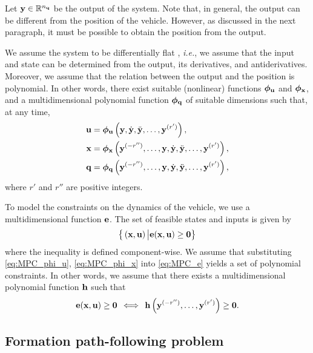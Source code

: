 Let $\mathbf{y} \in \mathbb{R}^{n_{\mathbf{q}}}$ be the output of the system.
Note that, in general, the output can be different from the position of the vehicle.
However, as discussed in the next paragraph, it must be possible to obtain the position from the output.

We assume the system to be differentially flat \cite{fliess_1995_flatness}, \emph{i.e.}, we assume that the input and state can be determined from the output, its derivatives, and antiderivatives. Moreover, we assume that the relation between the output and the position is polynomial.
In other words, there exist suitable (nonlinear) functions $\bm{\phi}_{\mathbf{u}}$ and $\bm{\phi}_{\mathbf{x}}$, and a multidimensional polynomial function $\bm{\phi}_{\mathbf{q}}$ of suitable dimensions such that, at any time,
%
\begin{align}
    \mathbf{u} &= \bm{\phi}_{\mathbf{u}} \left(\mathbf{y}, \dot{\mathbf{y}}, \ddot{\mathbf{y}}, \ldots, \mathbf{y}^{(r')}\right), \label{eq:MPC_phi_u} \\
    \mathbf{x} &= \bm{\phi}_{\mathbf{x}} \left(\mathbf{y}^{(-r'')}, \ldots, \mathbf{y}, \dot{\mathbf{y}}, \ddot{\mathbf{y}}, \ldots, \mathbf{y}^{(r')}\right), \label{eq:MPC_phi_x} \\ 
    \mathbf{q} &= \bm{\phi}_{\mathbf{q}} \left(\mathbf{y}^{(-r'')}, \ldots, \mathbf{y}, \dot{\mathbf{y}}, \ddot{\mathbf{y}}, \ldots, \mathbf{y}^{(r')}\right), \label{eq:MPC_phi_q}
\end{align}
%
where $r'$ and $r''$ are positive integers.

To model the constraints on the dynamics of the vehicle, we use a multidimensional function $\mathbf{e}$.
The set of feasible states and inputs is given by
\begin{equation}
    \big\{\left(\mathbf{x}, \mathbf{u}\right) \big| \mathbf{e} (\mathbf{x}, \mathbf{u}) \geq \bm{0}\big\}
    \label{eq:MPC_e}
\end{equation}
where the inequality is defined component-wise.
We assume that substituting \eqref{eq:MPC_phi_u}, \eqref{eq:MPC_phi_x} into \eqref{eq:MPC_e} yields a set of polynomial constraints.
In other words, we assume that there exists a multidimensional polynomial function $\mathbf{h}$ such that
\begin{equation}
    \mathbf{e} (\mathbf{x}, \mathbf{u})
    \geq
    \bm{0}
    \, \iff \,
    \mathbf{h} \left( \mathbf{y}^{(-r'')}, \ldots, \mathbf{y}^{(r')} \right)
    \geq
    \bm{0}.
\label{equ:MPC_constraint-h-geq-0}
\end{equation}



\subsection{Formation path-following problem}
\label{ssec:MPC_formation-path-following}



